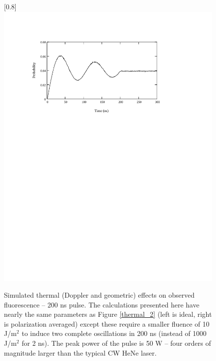 \begin{figure}
\scalebox{0.8}[0.8]{
\includegraphics[bb=10 490 550 690]
{thermal_200/thermal_200.pdf}
}
\caption[Simulated thermal (Doppler and geometric) effects on observed fluorescence -- 200 ns pulse]{Simulated thermal (Doppler and geometric) effects on observed fluorescence -- 200 ns pulse. The calculations presented here have nearly the same parameters as Figure \ref{thermal_2} (left is ideal, right is polarization averaged) except these require a smaller fluence of 10 J/m$^2$ to induce two complete oscillations in 200 ns (instead of 1000 J/m$^2$ for 2 ns). The peak power of the pulse is 50 W -- four orders of magnitude larger than the typical CW HeNe laser.}
\label{thermal_200}
\end{figure}
